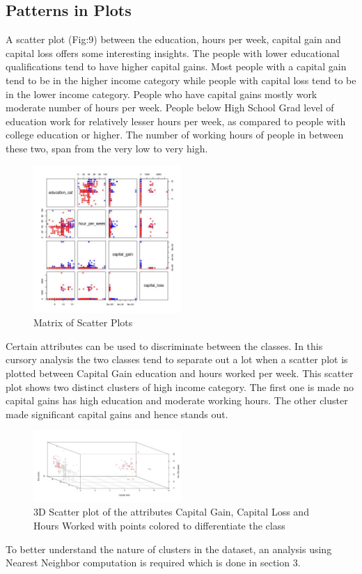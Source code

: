 \subsection{Patterns in Plots}
A scatter plot (Fig:9)  between the education, hours per week, capital gain and capital loss offers some interesting insights. The people with lower educational qualifications tend to have higher capital gains. Most people with a capital gain tend to be in the higher income category while people with capital loss tend to be in the lower income category. People who have capital gains mostly work moderate number of hours per week. People below High School Grad level of education work for relatively lesser hours per week, as compared to people with college education or higher. The number of working hours of people in between these two, span from the very low to very high.\\
\begin{figure}[h]
			\label{fig:scatter-matrix}
			\caption{Matrix of Scatter Plots}
			\centering
			\includegraphics[width=0.5\textwidth]{images/scatter-matrix.jpg}
\end{figure}
Certain attributes can be used to discriminate between the classes. In this cursory analysis the two classes tend to separate out a lot when a scatter plot is plotted between Capital Gain education and hours worked per week. This scatter plot shows two distinct clusters of high income category. The first one is made no capital gains has high education and moderate working hours. The other cluster made significant capital gains and hence stands out.\\
 \begin{figure}[h]
			\label{fig:3d-scatter}
			\caption{3D Scatter plot of the attributes Capital Gain, Capital Loss and Hours Worked with points colored to differentiate the class}
			\centering
			\includegraphics[width=0.5\textwidth]{images/3d-scatter.jpg}
	\end{figure}
To better understand the nature of clusters in the dataset, an analysis using Nearest Neighbor computation is required which is done in section 3.\\

